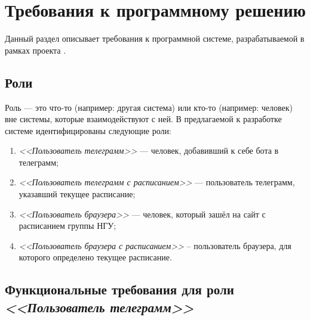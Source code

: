 \newcommand{\actor}[1]{\textit{<<#1>>}}

\chapter{Требования к программному решению}
	\label{chapter3}

	Данный раздел описывает требования к программной системе, разрабатываемой в рамках проекта \ProjectName.
		
	\section{Роли}
		Роль --- это что-то (например: другая система) или кто-то (например: человек) вне системы, которые взаимодействуют с ней. В предлагаемой к разработке системе идентифицированы следующие роли:
		\begin{enumerate}
			\item \actor{Пользователь телеграмм} --- человек, добавивший к себе бота в телеграмм;
			
			\item \actor{Пользователь телеграмм с расписанием} --- пользователь телеграмм, указавший текущее расписание;
			
			\item \actor{Пользователь браузера} --- человек, который зашёл на сайт с расписанием группы НГУ;
			
			\item \actor{Пользователь браузера с расписанием} -- пользователь браузера, для которого определено текущее расписание.
		\end{enumerate}
	
	    \begin{figure}[h!]
	    	\centering
	    	\def\svgwidth{\columnwidth}
	    	
	    \end{figure}
	
		\begin{figure}[h!]
			\centering
			\def\svgwidth{\columnwidth}
			
		\end{figure}
	

	\section{Функциональные требования для роли \actor{Пользователь телеграмм}}
